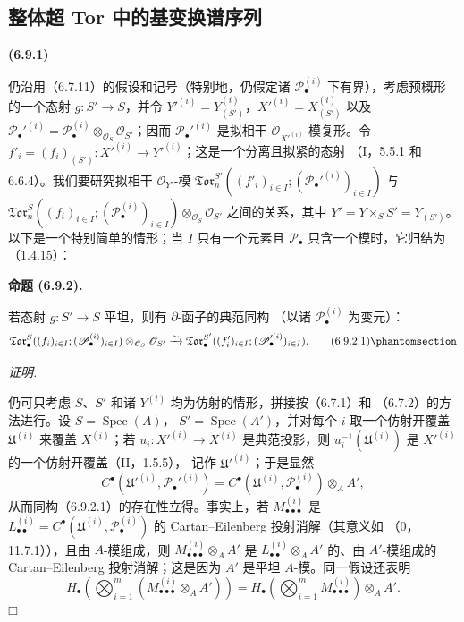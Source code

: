 \documentclass[UTF8,fontset=none,11pt,oneside,openany]{ctexbook}
\providecommand{\square}{\mdlgwhtsquare}
\newenvironment{env}[1][]{%
  \par\medskip\noindent\textbf{(#1)}\ %
}{\par}
\newenvironment{proposition}[1][]{%
  \par\medskip\noindent\textbf{命题 (#1).}\ %
}{\par}
\newenvironment{proof}{%
  \par\smallskip\noindent\textit{证明.}\ %
}{\hfill$\square$\par}
\newcommand{\oldpage}[2][]{%
  \hypertarget{ega-source-page-#1-#2}{}%
  \marginnote{\scriptsize\textbf{#1}~|~#2}\ignorespaces}
\let\EGAOriginalLabel\label
\renewcommand{\label}[1]{\phantomsection\EGAOriginalLabel{#1}}
\begin{document}
\oldpage[III]{166}
\subsection{整体超 Tor 中的基变换谱序列}

\begin{env}[6.9.1]
仍沿用（6.7.11）的假设和记号（特别地，仍假定诸
$\mathscr P_\bullet^{(i)}$ 下有界），考虑预概形的一个态射 $g:S'\to S$，并令
$Y'^{(i)}=Y_{(S')}^{(i)}$，$X'^{(i)}=X_{(S')}^{(i)}$ 以及
$\mathscr P_\bullet'^{(i)}=
\mathscr P_\bullet^{(i)}\otimes_{\mathscr O_S}\mathscr O_{S'}$；因而
$\mathscr P_\bullet'^{(i)}$ 是拟相干 $\mathscr O_{X'^{(i)}}$-模复形。令
$f'_i=(f_i)_{(S')}:X'^{(i)}\to Y'^{(i)}$；这是一个分离且拟紧的态射
（I，5.5.1 和 6.6.4）。我们要研究拟相干 $\mathscr O_{Y'}$-模
$\mathfrak{Tor}_n^{S'}((f'_i)_{i\in I};
(\mathscr P_\bullet'^{(i)})_{i\in I})$ 与
$\mathfrak{Tor}_n^S((f_i)_{i\in I};
(\mathscr P_\bullet^{(i)})_{i\in I})
\otimes_{\mathscr O_S}\mathscr O_{S'}$ 之间的关系，其中
$Y'=Y\times_S S'=Y_{(S')}$。以下是一个特别简单的情形；当 $I$ 只有一个元素且
$\mathscr P_\bullet$ 只含一个模时，它归结为（1.4.15）：
\end{env}

\begin{proposition}[6.9.2]
若态射 $g:S'\to S$ 平坦，则有 $\partial$-函子的典范同构
（以诸 $\mathscr P_\bullet^{(i)}$ 为变元）：
\[
  \mathfrak{Tor}_\bullet^S
  ((f_i)_{i\in I};(\mathscr P_\bullet^{(i)})_{i\in I})
  \otimes_{\mathscr O_S}\mathscr O_{S'}
  \xrightarrow{\sim}
  \mathfrak{Tor}_\bullet^{S'}
  ((f'_i)_{i\in I};(\mathscr P_\bullet'^{(i)})_{i\in I}).
  \tag{6.9.2.1}\label{III.6.9.2.1.fr}
\]
\end{proposition}

\begin{proof}
仍可只考虑 $S$、$S'$ 和诸 $Y^{(i)}$ 均为仿射的情形，拼接按（6.7.1）和
（6.7.2）的方法进行。设 $S=\operatorname{Spec}(A)$，
$S'=\operatorname{Spec}(A')$，并对每个 $i$ 取一个仿射开覆盖
$\mathfrak U^{(i)}$ 来覆盖 $X^{(i)}$；若 $u_i:X'^{(i)}\to X^{(i)}$ 是典范投影，则
$u_i^{-1}(\mathfrak U^{(i)})$ 是 $X'^{(i)}$ 的一个仿射开覆盖（II，1.5.5），
记作 $\mathfrak U'^{(i)}$；于是显然
\[
  C^\bullet(\mathfrak U'^{(i)},\mathscr P_\bullet'^{(i)})
  =C^\bullet(\mathfrak U^{(i)},\mathscr P_\bullet^{(i)})\otimes_A A',
\]
从而同构（6.9.2.1）的存在性立得。事实上，若
$M_{\bullet\bullet\bullet}^{(i)}$ 是
$L_{\bullet\bullet}^{(i)}=C^\bullet(\mathfrak U^{(i)},
\mathscr P_\bullet^{(i)})$ 的 Cartan--Eilenberg 投射消解（其意义如
（0，11.7.1）），且由 $A$-模组成，则
$M_{\bullet\bullet\bullet}^{(i)}\otimes_A A'$ 是
$L_{\bullet\bullet}^{(i)}\otimes_A A'$ 的、由 $A'$-模组成的
Cartan--Eilenberg 投射消解；这是因为 $A'$ 是平坦 $A$-模。同一假设还表明
\[
  H_\bullet\left(
    \bigotimes_{i=1}^m
    (M_{\bullet\bullet\bullet}^{(i)}\otimes_A A')
  \right)
  =H_\bullet\left(
    \bigotimes_{i=1}^m M_{\bullet\bullet\bullet}^{(i)}
  \right)\otimes_A A'.
\]
\end{proof}
\end{document}

